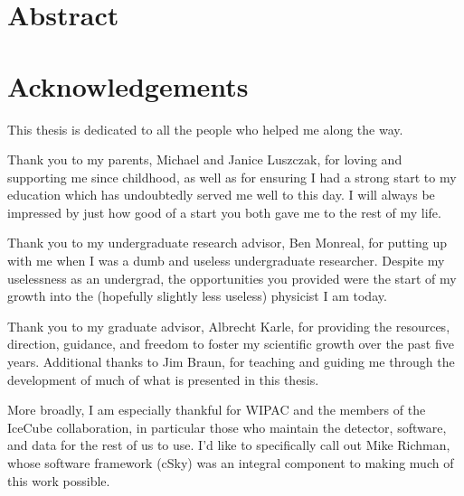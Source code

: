 \documentclass[oneside, letterpaper, 12pt, oldfontcommands]{memoir}
\begin{document}
\frontmatter


\thetitlepage
\clearpage

\thecopyrightpage
\cleardoublepage

\setcounter{page}{1}

\section{Abstract}
\uwabstract
\cleardoublepage

\section{Acknowledgements}
This thesis is dedicated to all the people who helped me along the way.

Thank you to my parents, Michael and Janice Luszczak, for loving and supporting me since childhood, as well as for ensuring I had a strong start to my education which has undoubtedly served me well to this day. I will always be impressed by just how good of a start you both gave me to the rest of my life. 

Thank you to my undergraduate research advisor, Ben Monreal, for putting up with me when I was a dumb and useless undergraduate researcher. Despite my uselessness as an undergrad, the opportunities you provided were the start of my growth into the (hopefully slightly less useless) physicist I am today. 

Thank you to my graduate advisor, Albrecht Karle, for providing the resources, direction, guidance, and freedom to foster my scientific growth over the past five years. Additional thanks to Jim Braun, for teaching and guiding me through the development of much of what is presented in this thesis.

More broadly, I am especially thankful for WIPAC and the members of the IceCube collaboration, in particular those who maintain the detector, software, and data for the rest of us to use. I'd like to specifically call out Mike Richman, whose software framework (cSky) was an integral component to making much of this work possible. 
\end{document}
